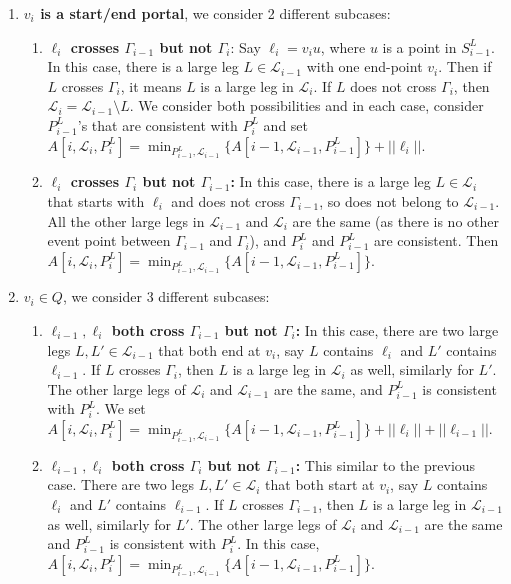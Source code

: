 \documentclass[10pt,a4paper]{amsart}
\theoremstyle{thmstyleone}
\begin{document}
\begin{enumerate}
    \item \textbf{$v_i$ is a start/end portal}, we consider 2 different subcases:
    \begin{enumerate}
        \item \textbf{$\ell_i$ crosses $\Gamma_{i-1}$ but not $\Gamma_i$}:
        Say $\ell_i=v_iu$, where $u$ is a point in $S^L_{i-1}$. 
        In this case, there is a large leg $L\in\mathcal L_{i-1}$ with one end-point $v_i$. Then if $L$ crosses $\Gamma_i$, it means $L$ is a large leg in $\mathcal L_i$. If $L$ does not cross $\Gamma_i$, then $\mathcal L_i=\mathcal L_{i-1} \setminus L$. We consider both possibilities and in each case, consider $P^L_{i-1}$'s that are consistent %
        with $P^L_i$ and 
        set $A[i,\mathcal L_i,P^L_i]=\min_{P^L_{i-1},\mathcal L_{i-1}} \{A[i-1,\mathcal L_{i-1},P^L_{i-1}]\}+||\ell_i||$.
        
        \item \textbf{$\ell_i$ crosses $\Gamma_i$ but not $\Gamma_{i-1}$:}
        In this case, there is a large leg $L\in\mathcal L_i$ that starts with $\ell_i$ and does not cross $\Gamma_{i-1}$, so does not belong to $\mathcal L_{i-1}$. All the other large legs in $\mathcal L_{i-1}$ and $\mathcal L_i$ are the same (as there is no other event point between $\Gamma_{i-1}$ and $\Gamma_i$), and $P^L_i$ and $P^L_{i-1}$ are consistent. Then 
        $A[i,\mathcal L_i,P^L_i]=\min_{P^L_{i-1},\mathcal L_{i-1}} \{A[i-1,\mathcal L_{i-1},P^L_{i-1}]\}$.
    \end{enumerate}
    \item \textbf{$v_i\in Q$}, we consider 3 different subcases:
    \begin{enumerate}
        \item \textbf{$\ell_{i-1},\ell_i$ both cross $\Gamma_{i-1}$ but not $\Gamma_i$:} In this case,
        there are two large legs $L,L'\in\mathcal L_{i-1}$ that both end at $v_i$, say $L$ contains $\ell_i$ and $L'$ contains $\ell_{i-1}$. If $L$ crosses $\Gamma_i$, then $L$ is a large leg in $\mathcal L_i$ as well, similarly for $L'.$ The other large legs of $\mathcal L_i$ and $\mathcal L_{i-1}$ are the same, and $P^L_{i-1}$ is consistent with $P^L_i$. We set $A[i,\mathcal L_i,P^L_i]= \min_{P^L_{i-1},\mathcal L_{i-1}}\{A[i-1,\mathcal L_{i-1},P^L_{i-1}]\}+||\ell_i||+||\ell_{i-1}||$.

        \item \textbf{$\ell_{i-1},\ell_i$ both cross $\Gamma_i$ but not $\Gamma_{i-1}$:} This similar to the previous case. There are two legs $L,L'\in\mathcal L_i$ that both start at $v_i$, say $L$ contains $\ell_i$ and $L'$ contains $\ell_{i-1}$. If $L$ crosses $\Gamma_{i-1}$, then $L$ is a large leg in $\mathcal L_{i-1}$ as well, similarly for $L'$. The other large legs of $\mathcal L_i$ and $\mathcal L_{i-1}$ are the same and $P^L_{i-1}$ is consistent with $P^L_i$.  In this case, $A[i,\mathcal L_i,P^L_i]=\min_{P^L_{i-1},\mathcal L_{i-1}} \{A[i-1,\mathcal L_{i-1},P^L_{i-1}]\}$.
        

\end{enumerate}
\end{enumerate}
\end{document}
